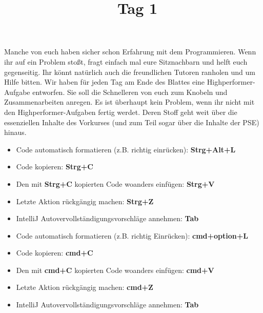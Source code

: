 \documentclass{../../sheet}
\title{\vkTitle\ Tag 1}
\begin{document}
\maketitle

\vkEventDayOne

Manche von euch haben sicher schon Erfahrung mit dem Programmieren. Wenn ihr auf ein Problem stoßt, fragt einfach mal eure Sitznachbarn und helft euch gegenseitig. Ihr könnt natürlich auch die freundlichen Tutoren ranholen und um Hilfe bitten.
Wir haben für jeden Tag am Ende des Blattes eine Highperformer-Aufgabe entworfen. Sie soll die Schnelleren von euch zum Knobeln und Zusammenarbeiten anregen. Es ist überhaupt kein Problem, wenn ihr nicht mit den Highperformer-Aufgaben fertig werdet. Deren Stoff geht weit über die essenziellen Inhalte des Vorkurses (und zum Teil sogar über die Inhalte der PSE) hinaus.


\begin{itemize}
	\item Code automatisch formatieren (z.B. richtig einrücken): \textbf{Strg+Alt+L}
	\item Code kopieren: \textbf{Strg+C}
	\item Den mit \textbf{Strg+C} kopierten Code woanders einfügen: \textbf{Strg+V}
	\item Letzte Aktion rückgängig machen: \textbf{Strg+Z}
	\item IntelliJ Autovervollständigungsvorschläge annehmen: \textbf{Tab}
\end{itemize}

\begin{itemize}
	\item Code automatisch formatieren (z.B. richtig Einrücken): \textbf{cmd+option+L}
	\item Code kopieren: \textbf{cmd+C}
	\item Den mit \textbf{cmd+C} kopierten Code woanders einfügen: \textbf{cmd+V}
	\item Letzte Aktion rückgängig machen: \textbf{cmd+Z}
	\item IntelliJ Autovervollständigungsvorschläge annehmen: \textbf{Tab}
\end{itemize}


\newpage
\end{document}
